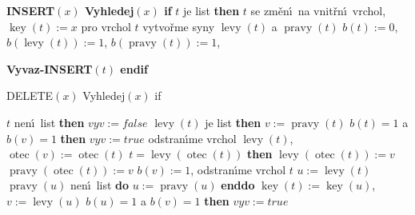 \documentclass[a4paper,12pt]{article}
\DeclareMathOperator*{\otec}{otec}
\DeclareMathOperator*{\levy}{levy}
\DeclareMathOperator*{\pravy}{pravy}
\DeclareMathOperator*{\key}{key}
\begin{document}
{\bf INSERT$(x)$\newline 
Vyhledej$(x)$\newline 
if} $t$ je list {\bf then}\newline 
\phantom{---}$t$ se zm\v en\'\i\ na vnit\v rn\'\i\ vrchol, $\key(t):=x$\newline 
\phantom{---}pro vrchol $t$ vytvo\v rme syny $\levy(t)$ a $\pravy(t)$\newline 
\phantom{---}$b(t):=0$, $b(\levy(t)):=1$, $b(\pravy(t)):=1$, {\bf Vyvaz-INSERT$(t)$\newline
endif
\medskip

DELETE$(x)$\newline 
Vyhledej$(x)$\newline 
if} $t$ nen\'\i\ list {\bf then}\newline 
\phantom{---}$vyv:=false$ \newline 
\phantom{---}{\bf if} $\levy(t)$ je list {\bf then}\newline 
\phantom{------}$v:=\pravy(t)$\newline 
\phantom{------}{\bf if} $b(t)=1$ a $b(v)=1$ {\bf then}\newline 
\phantom{---------}$vyv:=true$\newline 
\phantom{------}{\bf endif}\newline 
\phantom{------}odstran\'\i me vrchol $\levy(t)$, $\otec(v):=\otec(t)$\newline 
\phantom{------}{\bf if} $t=\levy(\otec(t))$ {\bf then}\newline 
\phantom{---------}$\levy(\otec(t)):=v$\newline 
\phantom{------}{\bf else}\newline 
\phantom{---------}$\pravy(\otec(t)):=v$\newline 
\phantom{------}{\bf endif}\newline 
\phantom{------}$b(v):=1$, odstran\'\i me vrchol $t$\newline 
\phantom{---}{\bf else}\newline 
\phantom{------}$u:=\levy(t)$\newline 
\phantom{------}{\bf while} $\pravy(u)$ nen\'\i\ list {\bf do} $u:=\pravy(u)$ {\bf enddo}\newline 
\phantom{------}$\key(t):=\key(u)$, $v:=\levy(u)$ \newline 
\phantom{------}{\bf if} $b(u)=1$ a $b(v)=1$ {\bf then}\newline 
\phantom{---------}$vyv:=true$\newline 
\phantom{------}{\bf endif}\newline 
\end{document}
